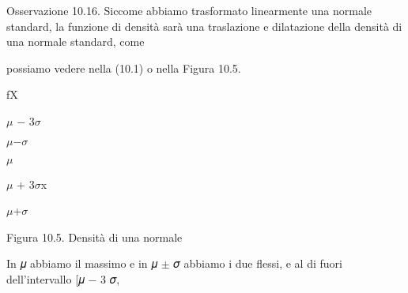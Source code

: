 \documentclass[a4paper,portrait,12pt]{article}
\begin{document}
\begin{flushleft}
Osservazione 10.16. Siccome abbiamo trasformato linearmente una normale standard, la funzione di densit\`{a} sar\`{a} una traslazione e dilatazione della densit\`{a} di una normale standard, come
\end{flushleft}


\begin{flushleft}
possiamo vedere nella (10.1) o nella Figura 10.5.
\end{flushleft}


\begin{flushleft}
fX
\end{flushleft}





\begin{flushleft}
$\mu$ $-$ 3$\sigma$
\end{flushleft}





\begin{flushleft}
$\mu$$-$$\sigma$
\end{flushleft}





\begin{flushleft}
$\mu$
\end{flushleft}





\begin{flushleft}
$\mu$ + 3$\sigma$x
\end{flushleft}





\begin{flushleft}
$\mu$+$\sigma$
\end{flushleft}





\begin{flushleft}
Figura 10.5. Densit\`{a} di una normale
\end{flushleft}





\begin{flushleft}
In 𝜇 abbiamo il massimo e in 𝜇 $\pm$ 𝜎 abbiamo i due flessi, e al di fuori dell'intervallo [𝜇 $-$ 3 𝜎,
\end{flushleft}
\end{document}
